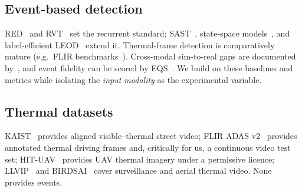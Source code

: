 \subsection{Event-based detection}
RED~\cite{perot2020red} and RVT~\cite{gehrig2023rvt} set the recurrent
standard; SAST~\cite{peng2024sast}, state-space models~\cite{zubic2024ssm},
and label-efficient LEOD~\cite{wu2024leod} extend it. Thermal-frame
detection is comparatively mature (e.g.\ FLIR
benchmarks~\cite{fliradas}). Cross-modal sim-to-real gaps are documented
by~\cite{stoffregen2020sim2real}, and event fidelity can be scored by
EQS~\cite{chanda2025eqs}. We build on these baselines and metrics while
isolating the \emph{input modality} as the experimental variable.

\subsection{Thermal datasets}
KAIST~\cite{hwang2015kaist} provides aligned visible--thermal street video;
FLIR ADAS v2~\cite{fliradas} provides annotated thermal driving frames and,
critically for us, a continuous video test set; HIT-UAV~\cite{suo2023hituav}
provides UAV thermal imagery under a permissive licence;
LLVIP~\cite{jia2021llvip} and BIRDSAI~\cite{bondi2020birdsai} cover
surveillance and aerial thermal video. None provides events.
